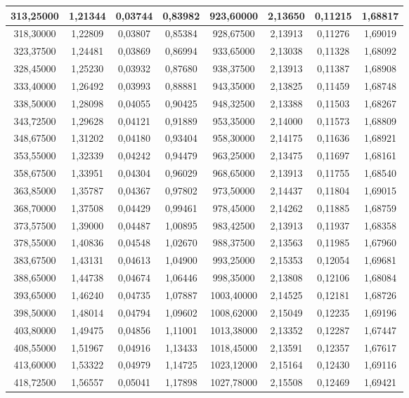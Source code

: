 \documentclass[a4paper,12pt]{article}
\numberwithin{equation}{section}
\begin{document}
\begin{appendices}
\begin{longtable}[c]{|c|c|c|c|c|c|c|c|}
313,25000	&	1,21344	&	0,03744	&	0,83982	&	923,60000	&	2,13650	&	0,11215	&	1,68817	\\\hline
318,30000	&	1,22809	&	0,03807	&	0,85384	&	928,67500	&	2,13913	&	0,11276	&	1,69019	\\\hline
323,37500	&	1,24481	&	0,03869	&	0,86994	&	933,65000	&	2,13038	&	0,11328	&	1,68092	\\\hline
328,45000	&	1,25230	&	0,03932	&	0,87680	&	938,37500	&	2,13913	&	0,11387	&	1,68908	\\\hline
333,40000	&	1,26492	&	0,03993	&	0,88881	&	943,35000	&	2,13825	&	0,11459	&	1,68748	\\\hline
338,50000	&	1,28098	&	0,04055	&	0,90425	&	948,32500	&	2,13388	&	0,11503	&	1,68267	\\\hline
343,72500	&	1,29628	&	0,04121	&	0,91889	&	953,35000	&	2,14000	&	0,11573	&	1,68809	\\\hline
348,67500	&	1,31202	&	0,04180	&	0,93404	&	958,30000	&	2,14175	&	0,11636	&	1,68921	\\\hline
353,55000	&	1,32339	&	0,04242	&	0,94479	&	963,25000	&	2,13475	&	0,11697	&	1,68161	\\\hline
358,67500	&	1,33951	&	0,04304	&	0,96029	&	968,65000	&	2,13913	&	0,11755	&	1,68540	\\\hline
363,85000	&	1,35787	&	0,04367	&	0,97802	&	973,50000	&	2,14437	&	0,11804	&	1,69015	\\\hline
368,70000	&	1,37508	&	0,04429	&	0,99461	&	978,45000	&	2,14262	&	0,11885	&	1,68759	\\\hline
373,57500	&	1,39000	&	0,04487	&	1,00895	&	983,42500	&	2,13913	&	0,11937	&	1,68358	\\\hline
378,55000	&	1,40836	&	0,04548	&	1,02670	&	988,37500	&	2,13563	&	0,11985	&	1,67960	\\\hline
383,67500	&	1,43131	&	0,04613	&	1,04900	&	993,25000	&	2,15353	&	0,12054	&	1,69681	\\\hline
388,65000	&	1,44738	&	0,04674	&	1,06446	&	998,35000	&	2,13808	&	0,12106	&	1,68084	\\\hline
393,65000	&	1,46240	&	0,04735	&	1,07887	&	1003,40000	&	2,14525	&	0,12181	&	1,68726	\\\hline
398,50000	&	1,48014	&	0,04794	&	1,09602	&	1008,62000	&	2,15049	&	0,12235	&	1,69196	\\\hline
403,80000	&	1,49475	&	0,04856	&	1,11001	&	1013,38000	&	2,13352	&	0,12287	&	1,67447	\\\hline
408,55000	&	1,51967	&	0,04916	&	1,13433	&	1018,45000	&	2,13591	&	0,12357	&	1,67617	\\\hline
413,60000	&	1,53322	&	0,04979	&	1,14725	&	1023,12000	&	2,15164	&	0,12430	&	1,69116	\\\hline
418,72500	&	1,56557	&	0,05041	&	1,17898	&	1027,78000	&	2,15508	&	0,12469	&	1,69421	\\\hline


\end{longtable}




\end{appendices}
\end{document}
